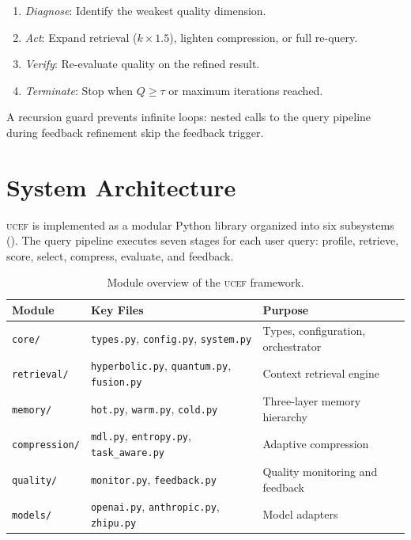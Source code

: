 \documentclass[11pt,letterpaper]{article}
\newcommand{\ucef}{\textsc{ucef}}
\begin{document}
\begin{enumerate}[nosep]
  \item \emph{Diagnose}: Identify the weakest quality dimension.
  \item \emph{Act}: Expand retrieval ($k \times 1.5$), lighten compression,
    or full re-query.
  \item \emph{Verify}: Re-evaluate quality on the refined result.
  \item \emph{Terminate}: Stop when $Q \geq \tau$ or maximum iterations
    reached.
\end{enumerate}

A recursion guard prevents infinite loops: nested calls to the query
pipeline during feedback refinement skip the feedback trigger.


\section{System Architecture}
\label{sec:architecture}

\ucef{} is implemented as a modular Python library organized into six
subsystems ().  The query pipeline executes seven stages
for each user query: profile, retrieve, score, select, compress, evaluate,
and feedback.

\begin{table}[t]
\centering
\caption{Module overview of the \ucef{} framework.}
\label{tab:modules}
\small
\begin{tabular}{@{}lll@{}}
\toprule
Module & Key Files & Purpose \\
\midrule
\texttt{core/}
  & \texttt{types.py}, \texttt{config.py}, \texttt{system.py}
  & Types, configuration, orchestrator \\
\texttt{retrieval/}
  & \texttt{hyperbolic.py}, \texttt{quantum.py}, \texttt{fusion.py}
  & Context retrieval engine \\
\texttt{memory/}
  & \texttt{hot.py}, \texttt{warm.py}, \texttt{cold.py}
  & Three-layer memory hierarchy \\
\texttt{compression/}
  & \texttt{mdl.py}, \texttt{entropy.py}, \texttt{task\_aware.py}
  & Adaptive compression \\
\texttt{quality/}
  & \texttt{monitor.py}, \texttt{feedback.py}
  & Quality monitoring and feedback \\
\texttt{models/}
  & \texttt{openai.py}, \texttt{anthropic.py}, \texttt{zhipu.py}
  & Model adapters \\
\bottomrule
\end{tabular}
\end{table}
\end{document}
